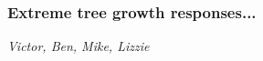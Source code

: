 \documentclass{article}
\begin{document}
% 

\subsubsection*{Extreme tree growth responses...}
\textit{Victor, Ben, Mike, Lizzie}
\newline

\end{document}
